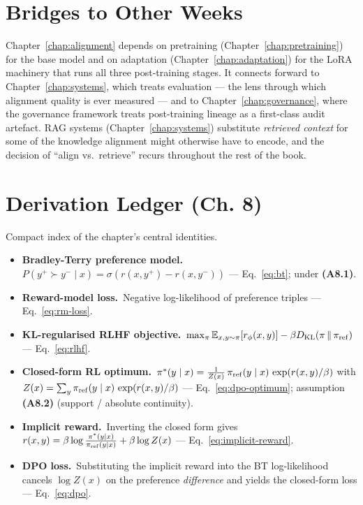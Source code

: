 \section{Bridges to Other Weeks}

Chapter~\ref{chap:alignment} depends on pretraining (Chapter~\ref{chap:pretraining}) for the base model and on
adaptation (Chapter~\ref{chap:adaptation}) for the LoRA machinery that runs all three
post-training stages. It connects forward to Chapter~\ref{chap:systems}, which treats
evaluation --- the lens through which alignment quality is ever
measured --- and to Chapter~\ref{chap:governance}, where the governance framework treats
post-training lineage as a first-class audit artefact. RAG systems
(Chapter~\ref{chap:systems}) substitute \emph{retrieved context} for some of the
knowledge alignment might otherwise have to encode, and the decision
of ``align vs.\ retrieve'' recurs throughout the rest of the book.

\section*{Derivation Ledger (Ch. 8)}

\begin{derivledger}
Compact index of the chapter's central identities.
\begin{itemize}
  \item \textbf{Bradley-Terry preference model.}\
        $P(y^+ \succ y^- \mid x) = \sigma(r(x, y^+) - r(x, y^-))$
        --- Eq.~\eqref{eq:bt}; under \textbf{(A8.1)}.
  \item \textbf{Reward-model loss.}\
        Negative log-likelihood of preference triples
        --- Eq.~\eqref{eq:rm-loss}.
  \item \textbf{KL-regularised RLHF objective.}\
        $\max_\pi \mathbb{E}_{x, y \sim \pi}[r_\phi(x,y)] - \beta D_{\mathrm{KL}}(\pi \,\|\, \pi_{\rm ref})$
        --- Eq.~\eqref{eq:rlhf}.
  \item \textbf{Closed-form RL optimum.}\
        $\pi^*(y \mid x) = \frac{1}{Z(x)}\, \pi_{\rm ref}(y \mid x)\, \exp(r(x, y)/\beta)$
        with $Z(x) = \sum_y \pi_{\rm ref}(y \mid x)\, \exp(r(x, y)/\beta)$
        --- Eq.~\eqref{eq:dpo-optimum}; assumption \textbf{(A8.2)}
        (support / absolute continuity).
  \item \textbf{Implicit reward.}\
        Inverting the closed form gives
        $r(x, y) = \beta \log \frac{\pi^*(y \mid x)}{\pi_{\rm ref}(y \mid x)} + \beta \log Z(x)$
        --- Eq.~\eqref{eq:implicit-reward}.
  \item \textbf{DPO loss.}\
        Substituting the implicit reward into the BT log-likelihood
        cancels $\log Z(x)$ on the preference \emph{difference} and
        yields the closed-form loss
        --- Eq.~\eqref{eq:dpo}.
\end{itemize}
\end{derivledger}

